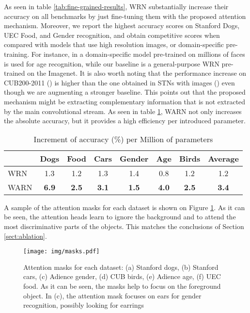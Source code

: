 \documentclass[runningheads]{llncs}
\begin{document}
As seen in table \ref{tab:fine-grained-results}, WRN substantially increase their accuracy on all benchmarks by just fine-tuning them with the proposed attention mechanism. Moreover, we report the highest accuracy scores on Stanford Dogs, UEC Food, and Gender recognition, and obtain competitive scores when compared with models that use high resolution images, or domain-specific pre-training. For instance, in \cite{Rothe-IJCV-2016} a domain-specific model pre-trained on millions of faces is used for age recognition, while our baseline is a general-purpose WRN pre-trained on the Imagenet. It is also worth noting that the performance increase on CUB200-2011 () is higher than the one obtained in STNs with  images () even though we are augmenting a stronger baseline. This points out that the proposed mechanism might be extracting complementary information that is not extracted by the main convolutional stream. As seen in table \ref{tab:acc_param}, WARN not only increases the absolute accuracy, but it provides a high efficiency per introduced parameter.

\begin{table}[t!]
\centering
\caption{Increment of accuracy (\%) per Million of parameters}
\label{tab:acc_param}
\begin{tabular}{@{}lccccccc@{}}
\toprule
\textbf{} & \textbf{Dogs} & \textbf{Food} & \textbf{Cars} & \textbf{Gender} & \textbf{Age} & \textbf{Birds} & \textbf{Average} \\ \midrule
WRN & 1.3 & 1.2 & 1.3 & 1.4 & 0.8 & 1.2 & 1.2 \\
WARN & \textbf{6.9} & \textbf{2.5} & \textbf{3.1} & \textbf{1.5} & \textbf{4.0} & \textbf{2.5} & \textbf{3.4} \\ \bottomrule
\end{tabular}
\end{table}

A sample of the attention masks for each dataset is shown on Figure \ref{fig:attention_masks}. As it can be seen, the attention heads learn to ignore the background and to attend the most discriminative parts of the objects. This matches the conclusions of Section \ref{sect:ablation}.

\begin{figure}[t!]
\centering
\texttt{[image: img/masks.pdf]}
\caption{Attention masks for each dataset: (a) Stanford dogs, (b) Stanford cars, (c) Adience gender, (d) CUB birds, (e) Adience age, (f) UEC food. As it can be seen, the masks help to focus on the foreground object. In (c), the attention mask focuses on ears for gender recognition, possibly looking for earrings }
\label{fig:attention_masks}
\end{figure}
\end{document}
